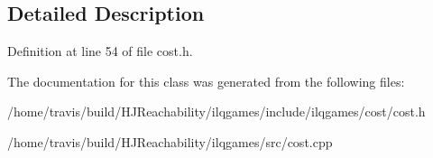 \subsection{Detailed Description}


Definition at line 54 of file cost.\+h.



The documentation for this class was generated from the following files\+:\begin{DoxyCompactItemize}
\item 
/home/travis/build/\+H\+J\+Reachability/ilqgames/include/ilqgames/cost/cost.\+h\item 
/home/travis/build/\+H\+J\+Reachability/ilqgames/src/cost.\+cpp\end{DoxyCompactItemize}
